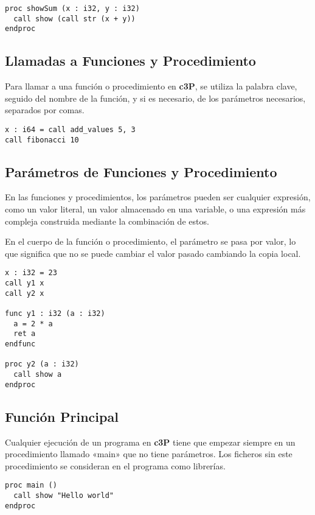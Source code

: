 \begin{verbatim}
proc showSum (x : i32, y : i32)
  call show (call str (x + y))
endproc
\end{verbatim}

\subsection{Llamadas a Funciones y Procedimiento}

Para llamar a una función o procedimiento en \textbf{c3P}, se utiliza la palabra clave,
seguido del nombre de la función, y si es necesario, de los parámetros necesarios, separados
por comas. 

\begin{verbatim}
x : i64 = call add_values 5, 3
call fibonacci 10
\end{verbatim}

\subsection{Parámetros de Funciones y Procedimiento}

En las funciones y procedimientos, los parámetros pueden ser cualquier expresión, como
un valor literal, un valor almacenado en una variable, o una expresión más compleja
construida mediante la combinación de estos. 

En el cuerpo de la función o procedimiento, el parámetro se pasa por valor, lo que
significa que no se puede cambiar el valor pasado cambiando la copia local. 

\begin{verbatim}
x : i32 = 23
call y1 x
call y2 x

func y1 : i32 (a : i32)
  a = 2 * a
  ret a
endfunc

proc y2 (a : i32)
  call show a
endproc
\end{verbatim}

\subsection{Función Principal}

Cualquier ejecución de un programa en \textbf{c3P} tiene que empezar siempre en
un procedimiento llamado «main» que no tiene parámetros. Los ficheros sin este
procedimiento se consideran en el programa como librerías.

\begin{verbatim}
proc main ()
  call show "Hello world"
endproc
\end{verbatim}

